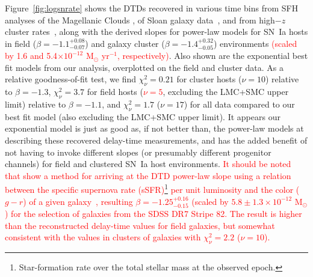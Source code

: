 \documentclass[apj, linenumbers]{aastex62}
\begin{document}
Figure~\ref{fig:logsnrate} shows the DTDs recovered in various time bins from SFH analyses of the Magellanic Clouds \citep{Maoz:2010}, of Sloan galaxy data~\citep{Maoz:2010a, Maoz:2011, Maoz:2012a,Graur:2013}, and from high$-z$ cluster rates~\citep{Friedmann:2018hq}, along with the derived  slopes for power-law models for SN~Ia hosts in field ($\beta=-1.1^{+0.08}_{-0.07}$) and galaxy cluster ($\beta=-1.4^{+0.32}_{-0.05}$) environments \textcolor{red}{(scaled by 1.6 and 5.4$\times10^{-12}$ M$_{\odot}$ yr$^{-1}$, respectively)}. Also shown are the exponential best fit models from our analysis, overplotted on the field and cluster data. As a relative goodness-of-fit test, we find  $\chi^2_{\nu}=0.21$ for cluster hosts ($\nu=10$) relative to $\beta=-1.3$, $\chi^2_{\nu}=3.7$ for field hosts (\textcolor{red}{$\nu=5$}, excluding the LMC+SMC upper limit) relative to $\beta=-1.1$, and $\chi^2_{\nu}=1.7$ ($\nu=17$) for all data compared to our best fit model (also excluding the LMC+SMC upper limit). It appears our exponential model is just as good as, if not better than, the power-law models at describing these recovered delay-time measurements, and has the added benefit of not having to invoke different slopes (or presumably different progenitor channels) for field and clustered SN~Ia host environments. \textcolor{red}{It should be noted that \cite{Heringer:2019ws} show a method for arriving at the DTD power-law slope using a relation between the specific supernova rate (sSFR)\footnote{Star-formation rate over the total stellar mass at the observed epoch.}  per unit luminosity and the color ($g-r$) of a given galaxy~\citep{Heringer:2017fp}, resulting  $\beta=-1.25^{+0.16}_{-0.15}$ (scaled by $5.8\pm1.3\times10^{-12}$ M$_{\odot}$) for the selection of galaxies from the SDSS DR7 Stripe 82. The result is higher than the reconstructed delay-time values for field galaxies, but somewhat consistent with the values in clusters of galaxies with $\chi^2_{\nu}=2.2$ ($\nu=10$). }
\end{document}
